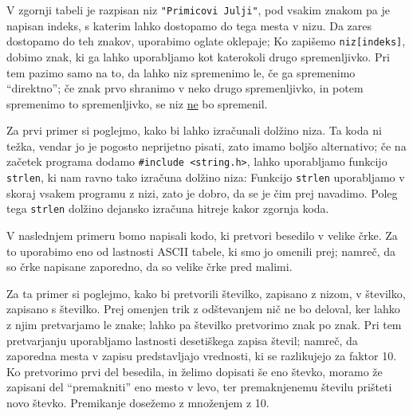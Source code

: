 \documentclass{book}
\begin{document}
\vspace{0.5cm}

V zgornji tabeli je razpisan niz \verb+"Primicovi Julji"+, pod vsakim znakom pa
je napisan indeks, s katerim lahko dostopamo do tega mesta v nizu.
Da zares dostopamo do teh znakov, uporabimo oglate oklepaje;
Ko zapišemo \verb+niz[indeks]+, dobimo znak, ki ga lahko uporabljamo kot
katerokoli drugo spremenljivko.
Pri tem pazimo samo na to, da lahko niz spremenimo le, če ga spremenimo
``direktno''; če znak prvo shranimo v neko drugo spremenljivko, in potem
spremenimo to spremenljivko, se niz \underline{ne} bo spremenil.

\begin{examples}
  Za prvi primer si poglejmo, kako bi lahko izračunali dolžino niza.
  Ta koda ni težka, vendar jo je pogosto neprijetno pisati, zato imamo boljšo
  alternativo; če na začetek programa dodamo \verb+#include <string.h>+, lahko
  uporabljamo funkcijo \verb+strlen+, ki nam ravno tako izračuna dolžino niza:
  Funkcijo \verb+strlen+ uporabljamo v skoraj vsakem programu z nizi, zato je
  dobro, da se je čim prej navadimo.
  Poleg tega \verb+strlen+ dolžino dejansko izračuna hitreje kakor zgornja koda.
\end{examples}

\begin{examples}
  V naslednjem primeru bomo napisali kodo, ki pretvori besedilo v velike črke.
  Za to uporabimo eno od lastnosti ASCII tabele, ki smo jo omenili prej; namreč,
  da so črke napisane zaporedno, da so velike črke pred malimi.
\end{examples}

\begin{examples}
  Za ta primer si poglejmo, kako bi pretvorili številko, zapisano z nizom, v
  številko, zapisano s številko.
  Prej omenjen trik z odštevanjem nič ne bo deloval, ker lahko z njim
  pretvarjamo le znake; lahko pa številko pretvorimo znak po znak.
  Pri tem pretvarjanju uporabljamo lastnosti desetiškega zapisa števil; namreč,
  da zaporedna mesta v zapisu predstavljajo vrednosti, ki se razlikujejo za
  faktor 10.
  Ko pretvorimo prvi del besedila, in želimo dopisati še eno števko, moramo že
  zapisani del ``premakniti'' eno mesto v levo, ter premaknjenemu številu
  prišteti novo števko.
  Premikanje dosežemo z množenjem z 10.
\end{examples}
\end{document}
